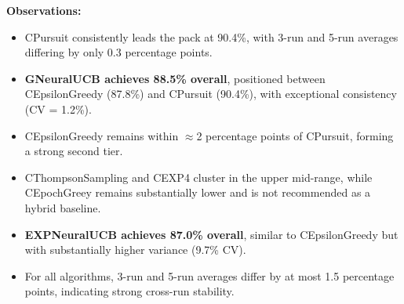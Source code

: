 \documentclass[12pt,a4paper]{article}
\newcommand{\legacy}[1]{\textcolor{legacycolor}{\textbf{#1}}}
\newcommand{\neural}[1]{\textcolor{neuralcolor}{\textbf{#1}}}
\begin{document}
\begin{tcolorbox}[colback=performancecolor!10,colframe=performancecolor,title=\textbf{Primary Performance Results (Aggregated Across Capacities, Environments, and Regimes)}]
\textbf{Observations:}
\begin{itemize}
\item CPursuit consistently leads the pack at 90.4\%, with 3-run and 5-run averages differing by only 0.3 percentage points.
\item \neural{GNeuralUCB achieves 88.5\% overall}, positioned between CEpsilonGreedy (87.8\%) and CPursuit (90.4\%), with exceptional consistency (CV = 1.2\%).
\item CEpsilonGreedy remains within $\approx$2 percentage points of CPursuit, forming a strong second tier.
\item CThompsonSampling and CEXP4 cluster in the upper mid-range, while CEpochGreey remains substantially lower and is not recommended as a hybrid baseline.
\item \legacy{EXPNeuralUCB achieves 87.0\% overall}, similar to CEpsilonGreedy but with substantially higher variance (9.7\% CV).
\item For all algorithms, 3-run and 5-run averages differ by at most 1.5 percentage points, indicating strong cross-run stability.
\end{itemize}

\end{tcolorbox}
\end{document}
